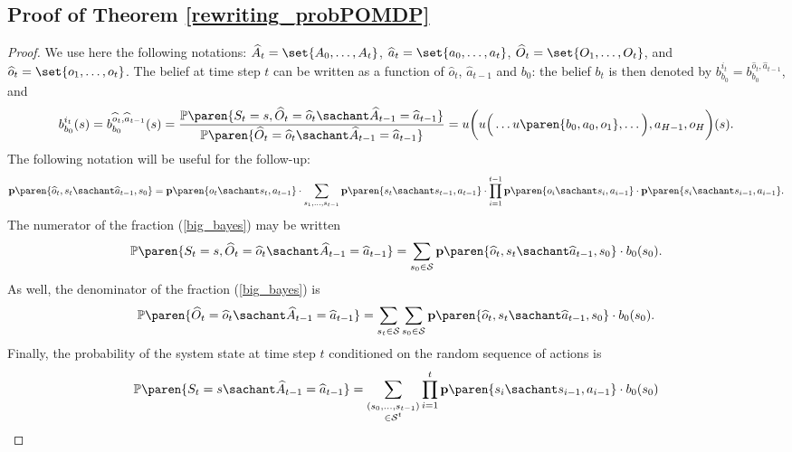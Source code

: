 \subsection{Proof of Theorem \ref{rewriting_probPOMDP}}
\label{rewriting_probPOMDP_RETURN}
\begin{proof}
We use here the following notations: 
$\widehat{A}_{t} = \set{ A_0, \ldots, A_{t} }$,
$\widehat{a}_{t} = \set{ a_0, \ldots, a_{t} }$,
$\widehat{O}_t = \set{ O_1, \ldots, O_t }$,
and $\widehat{o}_t = \set{ o_1, \ldots, o_t }$.
The belief at time step $t$ can be written
as a function of $\widehat{o}_t$, $\widehat{a}_{t-1}$ and $b_0$:
the belief $b_t$ is then denoted by $b^{i_t}_{b_0} = b^{\widehat{o}_t,\widehat{a}_{t-1}}_{b_0}$, and
\begin{equation}
b^{i_t}_{b_0}(s) = b^{\widehat{o}_t,\widehat{a}_{t-1}}_{b_0}(s) = \dfrac{ \mathbb{P} \paren{ S_t = s, \widehat{O}_t = \widehat{o}_t \sachant \widehat{A}_{t-1} = \widehat{a}_{t-1} }  }{ \mathbb{P} \paren{ \widehat{O}_t = \widehat{o}_t \sachant \widehat{A}_{t-1} = \widehat{a}_{t-1} }  } = u \bigg( u\Big( \ldots u \paren{ b_0,a_0,o_1}, \ldots \Big), a_{H-1}, o_H \bigg)(s).
\label{big_bayes}
\end{equation}
The following notation will be useful for the follow-up:
\[ \textbf{p} \paren{ \widehat{o}_t, s_t \sachant \widehat{a}_{t-1}, s_0 } = 
\textbf{p} \paren{ o_t \sachant s_t, a_{t-1} } \cdot \displaystyle \sum_{ s_1, \ldots, s_{t-1} } \textbf{p} \paren{ s_t \sachant s_{t-1}, a_{t-1} } \cdot \displaystyle \prod_{i=1}^{t-1} \textbf{p} \paren{ o_i \sachant s_i, a_{i-1} } \cdot \textbf{p} \paren{ s_i \sachant s_{i-1}, a_{i-1} }.\]
The numerator of the fraction (\ref{big_bayes})
may be written 
\[ \mathbb{P} \paren{ S_t = s, \widehat{O}_t = \widehat{o}_t \sachant \widehat{A}_{t-1} = \widehat{a}_{t-1} } = \displaystyle \sum_{s_0 \in \mathcal{S}} \textbf{p} \paren{ \widehat{o}_t, s_t \sachant \widehat{a}_{t-1}, s_0 } \cdot b_0(s_0). \]
As well, the denominator of the fraction (\ref{big_bayes}) is
\[\mathbb{P} \paren{ \widehat{O}_t = \widehat{o}_t \sachant \widehat{A}_{t-1} = \widehat{a}_{t-1} } = \displaystyle \sum_{s_t \in \mathcal{S}} \sum_{s_0 \in \mathcal{S}}  \textbf{p} \paren{ \widehat{o}_t, s_t \sachant \widehat{a}_{t-1}, s_0 } \cdot b_0(s_0). \]
Finally, the probability of the system state at time step $t$ conditioned on the random sequence of actions is
\begin{align*} 
\mathbb{P} \paren{ S_t = s \sachant \widehat{A}_{t-1} = \widehat{a}_{t-1} } & = \sum_{\substack{ (s_0, \ldots, s_{t-1}) \\ \in \mathcal{S}^t }} \prod_{i=1}^{t} \textbf{p} \paren{ s_i \sachant s_{i-1}, a_{i-1} } \cdot b_0(s_0) \\  

\end{align*}
\end{proof}
